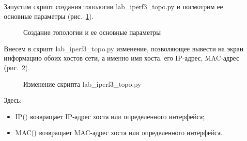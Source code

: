 \documentclass[
  english,
  russian,
  12pt,
  a4paper,
  DIV=11,
  numbers=noendperiod]{scrreprt}
\providecommand{\tightlist}{%
  \setlength{\itemsep}{0pt}\setlength{\parskip}{0pt}}
\begin{document}
Запустим скрипт создания топологии lab\_iperf3\_topo.py и посмотрим ее
основные параметры (рис.~\ref{fig-002}).

\begin{figure}


\caption{\label{fig-002}Создание топологии и ее основные параметры}

\end{figure}%

Внесем в скрипт lab\_iperf3\_topo.py изменение, позволяющее вывести на
экран информацию обоих хостов сети, а именно имя хоста, его IP-адрес,
MAC-адрес (рис.~\ref{fig-003}).

\begin{figure}


\caption{\label{fig-003}Изменение скрипта lab\_iperf3\_topo.py}

\end{figure}%

Здесь:

\begin{itemize}
\tightlist
\item
  IP() возвращает IP-адрес хоста или определенного интерфейса;
\item
  MAC() возвращает MAC-адрес хоста или определенного интерфейса.
\end{itemize}
\end{document}

